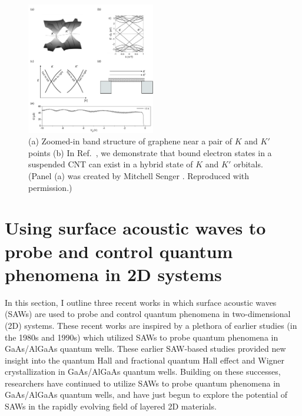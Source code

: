 \documentclass[double,12pt,1in,seploa]{beavtex}
\let\Oldsection\section
\renewcommand{\section}{\FloatBarrier\Oldsection}
\begin{document}
\begin{figure}
    \includegraphics[width = 0.5\textwidth]{CNT intro fig}
    \caption{(a) Zoomed-in band structure of graphene near a pair of $K$ and $K'$ points  (b) In Ref.\ \cite{berg_vernier_2024}, we demonstrate that bound electron states in a suspended CNT can exist in a hybrid state of $K$ and $K'$ orbitals. (Panel (a) was created by Mitchell Senger \cite{senger_optoelectronics_2021}. Reproduced with permission.)}
    \label{CNT intro fig}
\end{figure}

\section{Using surface acoustic waves to probe and control quantum phenomena in 2D systems} \label{using surface acoustic waves to probe and control quantum phenomena}

In this section, I outline three recent works in which surface acoustic waves (SAWs) are used to probe and control quantum phenomena in two-dimensional (2D) systems. These recent works are inspired by a plethora of earlier studies (in the 1980s and 1990s) which utilized SAWs to probe quantum phenomena in GaAs/AlGaAs quantum wells. These earlier SAW-based studies provided new insight into the quantum Hall and fractional quantum Hall effect \cite{wixforth_quantum_1986,esslinger_acoustoelectric_1992,esslinger_ultrasonic_1994,kukushkin_collective_2011,willett_experimental_1993} and Wigner crystallization \cite{paalanen_rf_1992} in GaAs/AlGaAs quantum wells. Building on these successes, researchers have continued to utilize SAWs to probe quantum phenomena in GaAs/AlGaAs quantum wells, and have just begun to explore the potential of SAWs in the rapidly evolving field of layered 2D materials.
\end{document}
